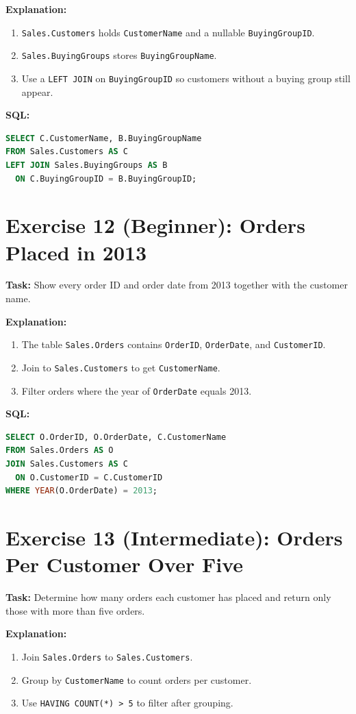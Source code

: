 \documentclass[12pt,a4paper]{article}
\begin{document}
\textbf{Explanation:}
\begin{enumerate}
  \item \texttt{Sales.Customers} holds \texttt{CustomerName} and a nullable \texttt{BuyingGroupID}.
  \item \texttt{Sales.BuyingGroups} stores \texttt{BuyingGroupName}.
  \item Use a \texttt{LEFT JOIN} on \texttt{BuyingGroupID} so customers without a buying group still appear.
\end{enumerate}

\textbf{SQL:}
\begin{lstlisting}[language=SQL]
SELECT C.CustomerName, B.BuyingGroupName
FROM Sales.Customers AS C
LEFT JOIN Sales.BuyingGroups AS B
  ON C.BuyingGroupID = B.BuyingGroupID;
\end{lstlisting}

\section{Exercise 12 (Beginner): Orders Placed in 2013}
\textbf{Task:} Show every order ID and order date from 2013 together with the customer name.

\textbf{Explanation:}
\begin{enumerate}
  \item The table \texttt{Sales.Orders} contains \texttt{OrderID}, \texttt{OrderDate}, and \texttt{CustomerID}.
  \item Join to \texttt{Sales.Customers} to get \texttt{CustomerName}.
  \item Filter orders where the year of \texttt{OrderDate} equals 2013.
\end{enumerate}

\textbf{SQL:}
\begin{lstlisting}[language=SQL]
SELECT O.OrderID, O.OrderDate, C.CustomerName
FROM Sales.Orders AS O
JOIN Sales.Customers AS C
  ON O.CustomerID = C.CustomerID
WHERE YEAR(O.OrderDate) = 2013;
\end{lstlisting}

\section{Exercise 13 (Intermediate): Orders Per Customer Over Five}
\textbf{Task:} Determine how many orders each customer has placed and return only those with more than five orders.

\textbf{Explanation:}
\begin{enumerate}
  \item Join \texttt{Sales.Orders} to \texttt{Sales.Customers}.
  \item Group by \texttt{CustomerName} to count orders per customer.
  \item Use \texttt{HAVING COUNT(*) > 5} to filter after grouping.
\end{enumerate}
\end{document}
